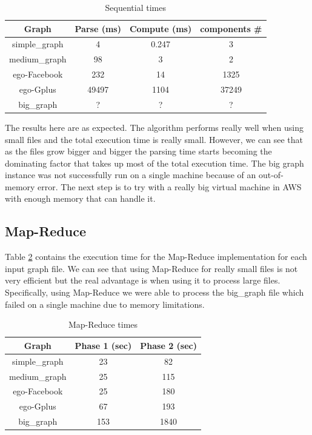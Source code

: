 \begin{table}[!h]
\scriptsize
\begin{center}
\begin{tabular}{|c|c|c|c|}
\hline
{\bf Graph} & {\bf Parse (ms)} & {\bf Compute (ms)} & {\bf components \#} \\
\hline
\hline
simple\_graph   & 4  & 0.247 & 3 \\
\hline
medium\_graph   & 98  & 3 & 2 \\
\hline
ego-Facebook   & 232 & 14 & 1325  \\
\hline
ego-Gplus   & 49497 & 1104 & 37249 \\
\hline
big\_graph   & ?  & ? & ?  \\
\hline
\end{tabular}
\caption{Sequential times}
\label{tb:sequentialtimes}
\end{center}
\end{table}

The results here are as expected. The algorithm performs really well when using small files and the total execution time is really small. However, we can see that as the files grow bigger and bigger the parsing time starts becoming the dominating factor that takes up most of the total execution time. The big graph instance was not successfully run on a single machine because of an out-of-memory error. The next step is to try with a really big virtual machine in AWS with enough memory that can handle it.

\subsection{Map-Reduce}

Table \ref{tb:MapReducetimes} contains the execution time for the Map-Reduce implementation for each input graph file. We can see that using Map-Reduce for really small files is not very efficient but the real advantage is when using it to process large files. Specifically,  using Map-Reduce we were able to process the big\_graph file which failed on a single machine due to memory limitations.

\begin{table}[h!]
\footnotesize
\begin{center}
\begin{tabular}{|c|c|c|}
\hline
{\bf Graph} & {\bf Phase 1 (sec)} & {\bf Phase 2 (sec)}\\
\hline
\hline
simple\_graph   & 23  & 82 \\
\hline
medium\_graph   & 25 & 115 \\
\hline
ego-Facebook   & 25 & 180 \\
\hline
ego-Gplus   & 67  & 193 \\
\hline
big\_graph   & 153 & 1840 \\
\hline
\end{tabular}
\caption{Map-Reduce times}
\label{tb:MapReducetimes}
\end{center}
\end{table}


